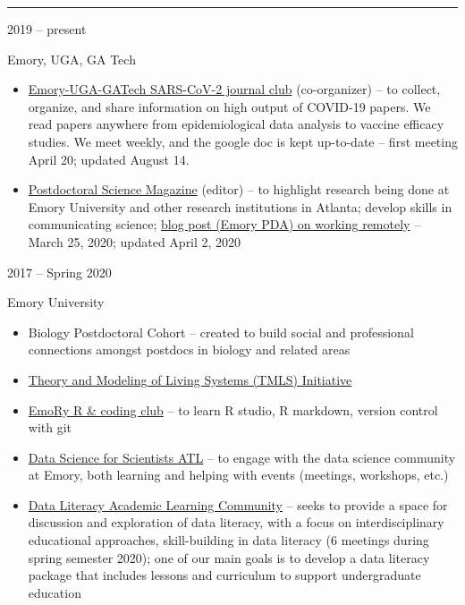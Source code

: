 \documentclass[a4paper,10pt]{article}
\newlength{\cvcolumngapwidth}
\newlength{\cvleftcolumnwidth}
\newlength{\cvrightcolumnwidth}
\newcommand{\cvsectionstyle}[1]{{\normalsize\cvsectionfont\textcolor{cvsectioncolor}{#1}}}
\newcommand{\cvtitlestyle}[1]{{\large\cvtitlefont\textcolor{cvtitlecolor}{#1}}}
\newcommand{\cvheadingstyle}[1]{{\normalsize\cvheadingfont\textcolor{cvheadingcolor}{#1}}}
\newlength{\cvafteritemskipamount}
\newlength{\cvaftersectionskipamount}
\newlength{\cvbetweensectionandheadingextraskipamount}
\newlength{\cvaftertitleskipamount}
\newlength{\cvparskip}
\newcommand{\cvsection}[1]{
    \begin{minipage}[t]{\cvleftcolumnwidth}
        \raggedleft\cvsectionstyle{#1}
    \end{minipage}%
    \hspace{\cvcolumngapwidth}%
    \begin{minipage}[t]{\cvrightcolumnwidth}
        \textcolor{cvrulecolor}{\rule{\cvrightcolumnwidth}{0.3mm}}
    \end{minipage}

    \vspace{\cvaftersectionskipamount}
}
\newcommand{\cvitem}[2]{
    \begin{minipage}[t]{\cvleftcolumnwidth}
        \raggedleft #1
    \end{minipage}%
    \hspace{\cvcolumngapwidth}%
    \begin{minipage}[t]{\cvrightcolumnwidth}
        \setlength{\parskip}{\cvparskip} #2
    \end{minipage}

    \vspace{\cvafteritemskipamount}
}
\newcommand{\cvtitle}[1]{
    \cvtitlestyle{#1}

    \vspace{\cvaftertitleskipamount}
    \vspace{-\cvparskip}
}
\begin{document}
\cvsection{GROUPS \& ORGANIZATIONS}
\vspace{\cvbetweensectionandheadingextraskipamount}

\cvitem{
    \cvheadingstyle{2019 -- present}
}{
    \cvtitle{Emory, UGA, GA Tech}
    \begin{itemize}[leftmargin=*]
        	\item \href{https://docs.google.com/document/d/1jMU-Rc--9MpwKwmoHNcR_SD4T0128dSvHaiJtECwO50/edit?usp=sharing}{Emory-UGA-GATech SARS-CoV-2 journal club} (co-organizer) --  to collect, organize, and share information on high output of COVID-19 papers. We read papers anywhere from epidemiological data analysis to vaccine efficacy studies. We meet weekly, and the google doc is kept up-to-date -- first meeting April 20; updated August 14.  \\
    	\item \href{https://emorypda.wordpress.com/postdoc-newsletter/}{Postdoctoral Science Magazine} (editor) --  to highlight research being done at Emory University and other research institutions in Atlanta; develop skills in communicating science; \href{https://emorypda.wordpress.com/2020/03/25/working-remotely-here-are-some-tips-to-stay-safe-and-productive-during-a-pandemic/}{blog post (Emory PDA) on working remotely} -- March 25, 2020; updated April 2, 2020 \\
    \end{itemize}
}

\cvitem{
    \cvheadingstyle{2017 -- Spring 2020}
}{
    \cvtitle{Emory University}
    \begin{itemize}[leftmargin=*]
        \item Biology Postdoctoral Cohort -- created to build social and professional connections amongst postdocs in biology and related areas \\
        \item \href{http://livingtheory.emory.edu/}{Theory and Modeling of Living Systems (TMLS) Initiative} \\
        \item \href{https://darwinanddavis.github.io/EmoRyCodingClub/index.html}{EmoRy R \& coding club} -- to learn R studio, R markdown, version control with git \\
        \item \href{https://emory.campuslabs.com/engage/organization/data-science-for-scientists-atl}{Data Science for Scientists ATL} -- to engage with the data science community at Emory, both learning and helping with events (meetings, workshops, etc.) \\
        \item \href{http://cfde.emory.edu/news-events/news/2019/november/data-literacy-alc.html}{Data Literacy Academic Learning Community} -- seeks to provide a space for discussion and exploration of data literacy, with a focus on interdisciplinary educational approaches, skill-building in data literacy (6 meetings during spring semester 2020); one of our main goals is to develop a data literacy package that includes lessons and curriculum to support undergraduate education
    \end{itemize}
}
\end{document}

